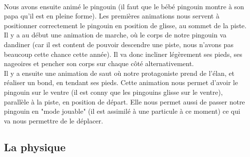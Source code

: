 \documentclass[11pt]{article}
\begin{document}
    \paragraph{}
    Nous avons ensuite animé le pingouin (il faut que le bébé pingouin montre à son papa qu'il est en pleine forme).
    Les premières animations nous servent à positionner correctement le pingouin en position de glisse, au sommet de la piste.
    Il y a au début une animation de marche, où le corps de notre pingouin va dandiner (car il est content de pouvoir descendre une piste, nous n'avons pas beaucoup cette chance cette année).
    Il va donc incliner légèrement ses pieds, ses nageoires et pencher son corps sur chaque côté alternativement.\\
    Il y a ensuite une animation de saut où notre protagoniste prend de l'élan, et réaliser un bond, en tendant ses pieds.
    Cette animation nous permet d'avoir le pingouin sur le ventre (il est conny que les pingouins glisse sur le ventre), parallèle à la piste, en position de départ.
    Elle nous permet aussi de passer notre pingouin en "mode jouable" (il est assimilé à une particule à ce moment) ce qui va nous permettre de le déplacer.


    \subsection{La physique}
    
\end{document}
